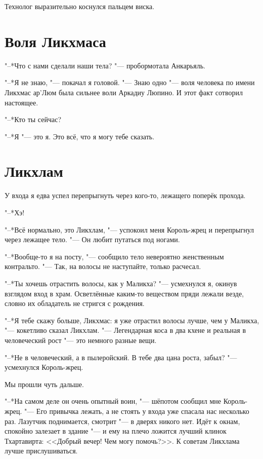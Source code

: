 \documentclass[a4paper,10pt]{book}
\begin{document}
Технолог выразительно коснулся пальцем виска. 
 
\section{Воля Ликхмаса}
 
"--*Что с нами сделали наши тела? "--- пробормотала Анкарьяль.

"--*Я не знаю, "--- покачал я головой. "--- Знаю одно "--- воля человека по 
имени Ликхмас ар'Люм была сильнее воли Аркадиу Люпино. И этот факт сотворил 
настоящее.

"--*Кто ты сейчас?

"--*Я "--- это я. Это всё, что я могу тебе сказать.

\section{Ликхлам}

У входа я едва успел перепрыгнуть через кого-то, лежащего поперёк прохода.

"--*Хэ!

"--*Всё нормально, это Ликхлам, "--- успокоил меня Король-жрец и перепрыгнул 
через лежащее тело.
"--- Он любит путаться под ногами.

"--*Вообще-то я на посту, "--- сообщило тело невероятно женственным контральто. "--- Так, 
на волосы не наступайте,
только расчесал.

"--*Ты хочешь отрастить волосы, как у Маликха? "--- усмехнулся я, окинув 
взглядом вход в храм. Осветлённые 
каким-то веществом пряди лежали везде, словно их обладатель не стригся с 
рождения.

"--*Я тебе скажу больше, Ликхмас: я уже отрастил волосы лучше, чем у Маликха, 
"--- кокетливо сказал Ликхлам.
"--- Легендарная коса в два кхене и реальная в человеческий рост "--- это 
немного разные вещи.

"--*Не в человеческий, а в пылеройский. В тебе два цана роста, забыл? "---
усмехнулся Король-жрец.

Мы прошли чуть дальше.

"--*На самом деле он очень опытный воин, "--- шёпотом сообщил мне Король-жрец. 
"--- 
Его привычка лежать, а не стоять у входа уже спасала нас несколько раз. 
Лазутчик поднимается,
смотрит "--- в дверях никого нет. Идёт к окнам, спокойно залезает в здание "---
и ему на плечо ложится лучший клинок Тхартавирта: <<Добрый вечер! Чем могу 
помочь?>>.
К советам Ликхлама лучше прислушиваться.
\end{document}
